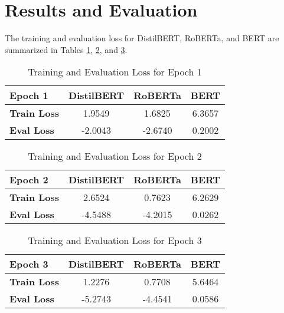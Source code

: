 \documentclass[conference]{IEEEtran}
\begin{document}
\section{Results and Evaluation}

The training and evaluation loss for DistilBERT, RoBERTa, and BERT are summarized in Tables \ref{tab:losses-epoch1}, \ref{tab:losses-epoch2}, and \ref{tab:losses-epoch3}.

\begin{table}[h]
    \centering
    \begin{tabular}{|l|c|c|c|}
        \hline
        \textbf{Epoch 1} & \textbf{DistilBERT} & \textbf{RoBERTa} & \textbf{BERT} \\ \hline
        \textbf{Train Loss} & 1.9549 & 1.6825 & 6.3657 \\ \hline
        \textbf{Eval Loss} & -2.0043 & -2.6740 & 0.2002 \\ \hline
    \end{tabular}
    \caption{Training and Evaluation Loss for Epoch 1}
    \label{tab:losses-epoch1}
\end{table}

\begin{table}[h]
    \centering
    \begin{tabular}{|l|c|c|c|}
        \hline
        \textbf{Epoch 2} & \textbf{DistilBERT} & \textbf{RoBERTa} & \textbf{BERT} \\ \hline
        \textbf{Train Loss} & 2.6524 & 0.7623 & 6.2629 \\ \hline
        \textbf{Eval Loss} & -4.5488 & -4.2015 & 0.0262 \\ \hline
    \end{tabular}
    \caption{Training and Evaluation Loss for Epoch 2}
    \label{tab:losses-epoch2}
\end{table}

\begin{table}[h]
    \centering
    \begin{tabular}{|l|c|c|c|}
        \hline
        \textbf{Epoch 3} & \textbf{DistilBERT} & \textbf{RoBERTa} & \textbf{BERT} \\ \hline
        \textbf{Train Loss} & 1.2276 & 0.7708 & 5.6464 \\ \hline
        \textbf{Eval Loss} & -5.2743 & -4.4541 & 0.0586 \\ \hline
    \end{tabular}
    \caption{Training and Evaluation Loss for Epoch 3}
    \label{tab:losses-epoch3}
\end{table}
\end{document}
